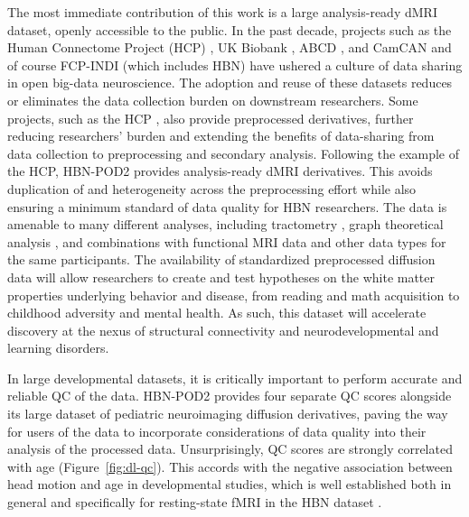 \documentclass[9pt,lineno]{elife}
\begin{document}
The most immediate contribution of this work is a large analysis-ready dMRI
dataset, openly accessible to the public. In the past decade, projects such as
the Human Connectome Project (HCP) \citep{van-essen2013-oi}, UK Biobank
\citep{miller2016-mq}, ABCD \citep{jernigan2018-my}, and CamCAN
\citep{taylor2017-or,shafto2014-ld} and of course FCP-INDI (which includes HBN)
\citep{Mennes2013-eu} have ushered a culture of data sharing in open big-data
neuroscience. The adoption and reuse of these datasets reduces or eliminates the
data collection burden on downstream researchers. Some projects, such as the HCP
\citep{glasser2013-lo}, also provide preprocessed derivatives, further reducing
researchers' burden and extending the benefits of data-sharing from data
collection to preprocessing and secondary analysis. Following the example of the
HCP, HBN-POD2 provides analysis-ready dMRI derivatives. This avoids duplication
of and heterogeneity across the preprocessing effort while also ensuring a minimum standard of data quality
for HBN researchers. The data is amenable to many different analyses, including
tractometry \citep{yeatman2012-rc, yeatman2018browser, kruper2021evaluating}, graph theoretical analysis \citep{yeh2020-nu},
and combinations with functional MRI data and other data types for the same
participants. The availability of standardized preprocessed diffusion data will
allow researchers to create and test hypotheses on the white matter properties
underlying behavior and disease, from reading and math acquisition to childhood
adversity and mental health. As such, this dataset will accelerate discovery at
the nexus of structural connectivity and neurodevelopmental and learning
disorders.

In large developmental datasets, it is critically important to perform accurate and reliable QC of
the data.  HBN-POD2 provides four separate QC scores alongside its large dataset
of pediatric neuroimaging diffusion derivatives, paving the way for users of the
data to incorporate considerations of data quality into their analysis of the
processed data. Unsurprisingly, QC scores are strongly correlated with
age (Figure~\ref{fig:dl-qc}). This accords with the negative association
between head motion and age in developmental studies, which is well established both in general
\citep{power2012spurious,satterthwaite2012impact,fair2012distinct,yendiki2014spurious}
and specifically for resting-state fMRI in the HBN dataset \citep{alexander2017-yc}.
\end{document}
